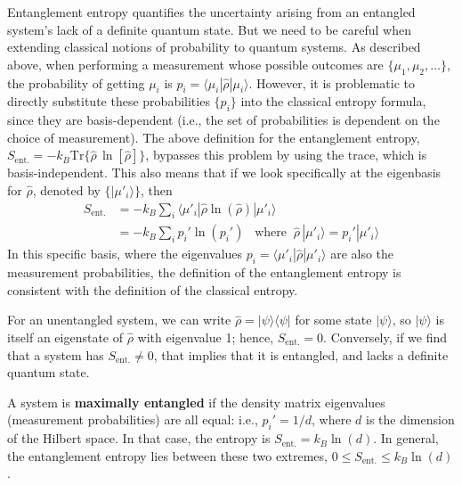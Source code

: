 \documentclass[pra,11pt]{revtex4}
\begin{document}
Entanglement entropy quantifies the uncertainty arising from an
entangled system's lack of a definite quantum state.  But we need to
be careful when extending classical notions of probability to quantum
systems.  As described above, when performing a measurement whose
possible outcomes are $\{\mu_1, \mu_2, \dots\}$, the probability of
getting $\mu_i$ is $p_i = \langle \mu_i | \hat{\rho}|\mu_i\rangle$.
However, it is problematic to directly substitute these probabilities
$\{p_i\}$ into the classical entropy formula, since they are
basis-dependent (i.e., the set of probabilities is dependent on the
choice of measurement).  The above definition for the entanglement
entropy, $S_{\mathrm{ent.}} = - k_B \mathrm{Tr} \big\{ \hat{\rho}\, \ln[\hat{\rho}]
\big\}$, bypasses this problem by using the trace, which is
basis-independent.  This also means that if we look specifically at
the eigenbasis for $\hat{\rho}$, denoted by $\{|\mu'_i\rangle\}$, then
$$\begin{aligned}S_{\mathrm{ent.}} &= -k_B \sum_i \langle \mu'_i | \hat{\rho}\ln(\hat{\rho}) | \mu'_i\rangle  \\ &= - k_B \sum_i p_i' \ln(p_i') \;\;\;\mathrm{where}\;\;\hat{\rho}\,|\mu'_i\rangle = p_i' |\mu'_i\rangle\end{aligned}$$
In this specific basis, where the eigenvalues $p_i =
\langle\mu'_i|\hat{\rho}|\mu'_i\rangle$ are also the measurement
probabilities, the definition of the entanglement entropy is
consistent with the definition of the classical entropy.

For an unentangled system, we can write $\hat{\rho} =
|\psi\rangle\langle\psi|$ for some state $|\psi\rangle$, so
$|\psi\rangle$ is itself an eigenstate of $\hat{\rho}$ with eigenvalue
1; hence, $S_{\mathrm{ent.}} = 0$.  Conversely, if we find that a
system has $S_{\mathrm{ent.}} \ne 0$, that implies that it is
entangled, and lacks a definite quantum state.

A system is \textbf{maximally entangled} if the density matrix
eigenvalues (measurement probabilities) are all equal: i.e., $p_i' =
1/d$, where $d$ is the dimension of the Hilbert space.  In that case,
the entropy is $S_{\mathrm{ent.}} = k_B \ln(d)$.  In general, the
entanglement entropy lies between these two extremes, $0 \le
S_{\mathrm{ent.}} \le k_B\ln(d)$.
\end{document}
